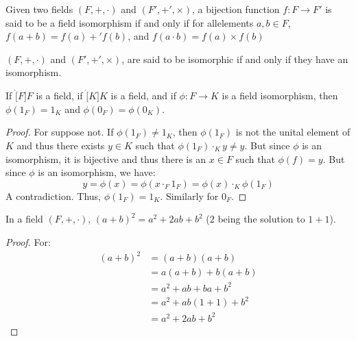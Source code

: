     \begin{definition}
        Given two fields $(F,+,\cdot)$ and $(F',+',\times)$, a bijection
        function $f:F\rightarrow{F}'$ is said to be a field isomorphism if and
        only if for allelements $a,b\in{F}$, $f(a+b)=f(a)+'f(b)$, and
        $f(a\cdot{b})=f(a)\times{f}(b)$
    \end{definition}
    \begin{definition}
        $(F,+,\cdot)$ and $(F',+',\times)$, are said to be isomorphic if and
        only if they have an isomorphism.
    \end{definition}
    \begin{theorem}
        If $\ring[F]{F}$ is a field, if $\ring[K]{K}$ is a field, and if
        $\phi:F\rightarrow{K}$ is a field isomorphism, then
        $\phi(1_{F})=1_{K}$ and $\phi(0_{F})=\phi(0_{K})$.
    \end{theorem}
    \begin{proof}
        For suppose not. If $\phi(1_{F})\ne{1}_{K}$, then $\phi(1_{F})$ is not
        the unital element of $K$ and thus there exists $y\in{K}$ such that
        $\phi(1_{F})\cdot_{K}y\ne{y}$. But since $\phi$ is an isomorphism, it is
        bijective and thus there is an $x\in{F}$ such that $\phi(f)=y$. But
        since $\phi$ is an isomorphism, we have:
        \begin{equation}
            y=\phi(x)=\phi(x\cdot_{F}1_{F})=\phi(x)\cdot_{K}\phi(1_{F})
        \end{equation}
        A contradiction. Thus, $\phi(1_{F})=1_{K}$. Similarly for $0_{F}$.
    \end{proof}
    \begin{theorem}
        In a field $(F,+,\cdot)$, $(a+b)^{2}=a^{2}+2ab+b^{2}$
        ($2$ being the solution to $1+1$).
    \end{theorem}
    \begin{proof}
        For:
        \begin{align}
            (a+b)^{2}&=(a+b)(a+b)\\
                     &=a(a+b)+b(a+b)\\
                     &=a^{2}+ab+ba+b^{2}\\
                     &=a^{2}+ab(1+1)+b^{2}\\
                     &=a^{2}+2ab+b^{2}
        \end{align}
    \end{proof}
